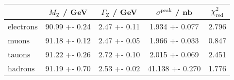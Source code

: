 \begin{tabular}{lS[table-format=2.2,table-figures-uncertainty=3]S[table-format=1.2,table-figures-uncertainty=3]S[table-format=2.3,table-figures-uncertainty=4]S[table-format=1.3]}
	\toprule
	{}& {$M_\mathrm{Z}$ / GeV} & {$\Gamma_\mathrm{Z}$ / GeV} & {$\sigma^\mathrm{peak}$ / nb} & {$\chi_\mathrm{red}^2$} \\
	\midrule
	electrons & 90.99 +- 0.24 & 2.47 +- 0.11 & 1.934 +- 0.077 & 2.796 \\
	muons & 91.18 +- 0.12 & 2.47 +- 0.05 & 1.966 +- 0.033 & 0.847 \\
	tauons & 91.22 +- 0.26 & 2.72 +- 0.10 & 2.015 +- 0.069 & 2.451 \\
	hadrons & 91.19 +- 0.70 & 2.53 +- 0.02 & 41.138 +- 0.270 & 1.776 \\	
	\bottomrule	
\end{tabular}